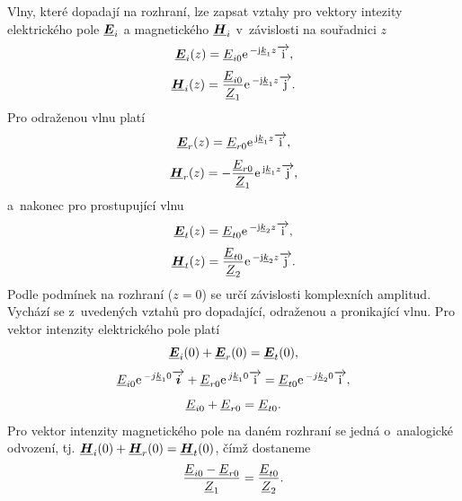 Vlny, které dopadají na rozhraní, lze zapsat vztahy pro vektory intezity elektrického pole $\mbox{\underline{\boldmath$E$}}_{i}$ a magnetického $\mbox{\underline{\boldmath$H$}}_{i}$ v~závislosti na souřadnici $z$
\begin{displaymath}
	\mbox{\underline{\boldmath$E$}}_{i}(z) = {\underline{E}}_{i0}\mathrm{e\,}^{-\mathrm{j}{\underline{k}}_{1}z}\overrightarrow{\mathrm{i}},
\end{displaymath}
\begin{displaymath}
	\mbox{\underline{\boldmath$H$}}_{i}(z) = \frac{{\underline{E}}_{i0}}{{\underline{Z}}_{1}}\mathrm{e\,}^{-\mathrm{j}{\underline{k}}_{1}z}\overrightarrow{\mathrm{j}}.
\end{displaymath}
Pro odraženou vlnu platí
\begin{displaymath}
	\mbox{\underline{\boldmath$E$}}_{r}(z) = {\underline{E}}_{r0}\mathrm{e\,}^{\mathrm{j}{\underline{k}}_{1}z}\overrightarrow{\mathrm{i}},
\end{displaymath}
\begin{displaymath}
	\mbox{\underline{\boldmath$H$}}_{r}(z) = - \frac{{\underline{E}}_{r0}}{{\underline{Z}}_{1}}\mathrm{e\,}^{\mathrm{j}{\underline{k}}_{1}z}\overrightarrow{\mathrm{j}},
\end{displaymath}
a~nakonec pro prostupující vlnu
\begin{displaymath}
	\mbox{\underline{\boldmath$E$}}_{t}(z) = {\underline{E}}_{t0}\mathrm{e\,}^{-\mathrm{j}{\underline{k}}_{2}z}\overrightarrow{\mathrm{i}},
\end{displaymath}
\begin{displaymath}
	\mbox{\underline{\boldmath$H$}}_{t}(z) = \frac{{\underline{E}}_{t0}}{{\underline{Z}}_{2}}\mathrm{e\,}^{-\mathrm{j}{\underline{k}}_{2}z}\overrightarrow{\mathrm{j}}.
\end{displaymath}
Podle podmínek na rozhraní ($z = 0$) se určí závislosti komplexních amplitud. Vychází se z~uvedených vztahů pro dopadající, odraženou a pronikající vlnu.
Pro vektor intenzity elektrického pole platí
\begin{displaymath}
	\mbox{\underline{\boldmath$E$}}_{i}(0) + \mbox{\underline{\boldmath$E$}}_{r}(0)  = \mbox{\underline{\boldmath$E$}}_{t}(0),
\end{displaymath}
\begin{displaymath}
	 {\underline{E}}_{i0}\mathrm{e\,}^{-j{\underline{k}}_{1}0}\overrightarrow{\mbox{\boldmath$i$}} + {\underline{E}}_{r0}\mathrm{e\,}^{j{\underline{k}}_{1}0}\overrightarrow{\mathrm{i}}  = {\underline{E}}_{t0}\mathrm{e\,}^{-j{\underline{k}}_{2}0}\overrightarrow{\mathrm{i}},
\end{displaymath}
\begin{equation}
	{\underline{E}}_{i0} + {\underline{E}}_{r0}  = {\underline{E}}_{t0}.
	\label{rce:evlny_rozhrani_E}
\end{equation}
Pro vektor intenzity magnetického pole na daném rozhraní se jedná o~analogické odvození, tj. $\mbox{\underline{\boldmath$H$}}_{i}(0) + \mbox{\underline{\boldmath$H$}}_{r}(0)  = \mbox{\underline{\boldmath$H$}}_{t}(0)$, čímž dostaneme
\begin{equation}
	\frac{{\underline{E}}_{i0}-{\underline{E}}_{r0}}{{\underline{Z}}_{1}} = \frac{{\underline{E}}_{t0}}{{\underline{Z}}_{2}}.
	\label{rce:evlny_rozhrani_H}
\end{equation}
